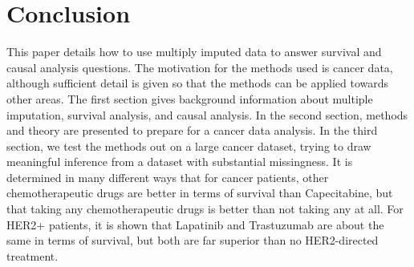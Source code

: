 \chapter{Conclusion}
This paper details how to use multiply imputed data to answer survival and causal analysis questions. The motivation for the methods used is cancer data, although sufficient detail is given so that the methods can be applied towards other areas. The first section gives background information about multiple imputation, survival analysis, and causal analysis. In the second section, methods and theory are presented to prepare for a cancer data analysis. In the third section, we test the methods out on a large cancer dataset, trying to draw meaningful inference from a dataset with substantial missingness. It is determined in many different ways that for cancer patients, other chemotherapeutic drugs are better in terms of  survival than Capecitabine, but that taking any chemotherapeutic drugs is better than not taking any at all. For HER2+ patients, it is shown that Lapatinib and Trastuzumab are about the same in terms of survival, but both are far superior than no HER2-directed treatment.
